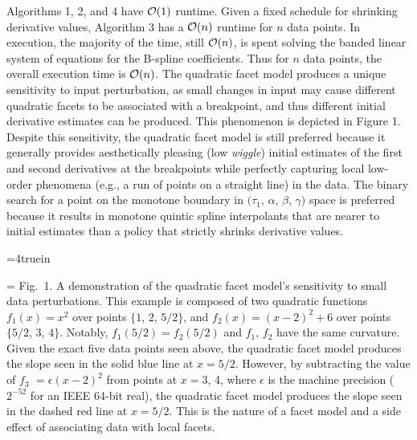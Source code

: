 Algorithms 1, 2, and 4 have ${\cal O}(1)$ runtime. Given a fixed
schedule for shrinking derivative values, Algorithm 3 has a ${\cal
  O}(n)$ runtime for $n$ data points. In execution, the majority of
the time, still ${\cal O}(n)$, is spent solving the banded linear
system of equations for the B-spline coefficients. Thus for $n$ data
points, the overall execution time is ${\cal O}(n)$. The quadratic
facet model produces a unique sensitivity to input perturbation, as
small changes in input may cause different quadratic facets to be
associated with a breakpoint, and thus different initial derivative
estimates can be produced. This phenomenon is depicted in Figure
1. Despite this sensitivity, the quadratic facet model is still
preferred because it generally provides aesthetically pleasing (low
{\it wiggle}) initial estimates of the first and second derivatives at
the breakpoints while perfectly capturing local low-order phenomena
(e.g., a run of points on a straight line) in the data. The binary
search for a point on the monotone boundary in $(\tau_1$, $\alpha$,
$\beta$, $\gamma)$ space is preferred because it results in monotone
quintic spline interpolants that are nearer to initial estimates than
a policy that strictly shrinks derivative values.

\topinsert
\centerline{\epsfxsize=4truein }
{\everymath={\scriptstyle}
\narrower\noindent\rmVIII Fig.\ 1. A demonstration of the quadratic
  facet model's sensitivity to small data perturbations. This example is
  composed of two quadratic functions $f_1(x) = x^2$ over points $\{1$,
  $2$, $5/2\}$, and $f_2(x) = (x-2)^2 + 6$ over points $\{5/2$, $3$,
  $4\}$. Notably, $f_1(5/2) = f_2(5/2)$ and $f_1$, $f_2$ have the same
  curvature. Given the exact five data points seen above, the quadratic
  facet model produces the slope seen in the solid blue line at $x = 5/2$.
  However, by subtracting the value of $f_3$ $= \epsilon(x-2)^2$ from
  points at $x = 3$, 4, where $\epsilon$ is the machine precision
  ($2^{-52}$ for an IEEE 64-bit real), the quadratic facet model produces
  the slope seen in the dashed red line at $x = 5/2$. This is the nature
  of a facet model and a side effect of associating data with local facets.
\par} \endinsert
